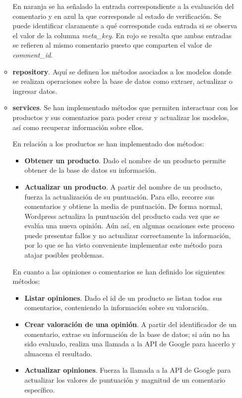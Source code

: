 \begin{itemize}
\begin{itemize}
        \newpage 
        
        En naranja se ha señalado la entrada correspondiente a la evaluación del comentario y en azul la que corresponde al estado de verificación. Se puede identificar claramente a qué corresponde cada entrada si se observa el valor de la columna \textit{meta\_key}. En rojo se resalta que ambas entradas se refieren al mismo comentario puesto que comparten el valor de \textit{comment\_id}.
        
        \item \textbf{repository}. Aquí se definen los métodos asociados a los modelos donde se realizan operaciones sobre la base de datos como extraer, actualizar o ingresar datos.
        
        \item \textbf{services}. Se han implementado métodos que permiten interactuar con los productos y sus comentarios para poder crear  y actualizar los modelos, así como recuperar información sobre ellos. 
        
        En relación a los productos se han implementado dos métodos:
        \begin{itemize}
            \item \textbf{Obtener un producto}. Dado el nombre de un producto permite obtener de la base de datos su información.
            \item \textbf{Actualizar un producto}. A partir del nombre de un producto, fuerza la actualización de su puntuación. Para ello, recorre sus comentarios y obtiene la media de puntuación. De forma normal, Wordpress actualiza la puntuación del producto cada vez que se evalúa una nueva opinión. Aún así, en algunas ocasiones este proceso puede presentar fallos y no actualizar correctamente la información, por lo que se ha visto conveniente implementar este método para atajar posibles problemas.
        \end{itemize}
        
        En cuanto a las opiniones o comentarios se han definido los siguientes métodos:
        \begin{itemize}
            \item \textbf{Listar opiniones}. Dado el id de un producto se listan todos sus comentarios, conteniendo la información sobre su valoración.
            \item \textbf{Crear valoración de una opinión}. A partir del identificador de un comentario, extrae su información de la base de datos; si aún no ha sido evaluado, realiza una llamada a la API de Google para hacerlo y almacena el resultado.
            \item \textbf{Actualizar opiniones}. Fuerza la llamada a la API de Google para actualizar los valores de puntuación y magnitud de un comentario específico.
        \end{itemize}
        

\end{itemize}
\end{itemize}
